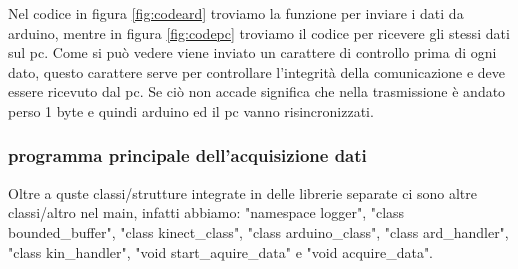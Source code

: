 \documentclass[10pt,a4paper]{article}
\begin{document}
Nel codice in figura \ref{fig:codeard} troviamo la funzione per inviare i dati da arduino, mentre in figura \ref{fig:codepc} troviamo il codice per ricevere gli stessi dati sul pc. Come si pu\`o vedere viene inviato un carattere di controllo prima di ogni dato, questo carattere serve per controllare l'integrit\`a della comunicazione e deve essere ricevuto dal pc. Se ci\`o non accade significa che nella trasmissione \`e andato perso 1 byte e quindi arduino ed il pc vanno risincronizzati. 
\clearpage
%
%
\subsubsection{programma principale dell'acquisizione dati}
Oltre a quste classi/strutture integrate in delle librerie separate ci sono altre classi/altro nel main, infatti abbiamo: "namespace logger", "class bounded\_buffer", "class kinect\_class", "class arduino\_class", "class ard\_handler", "class kin\_handler", "void start\_aquire\_data" e "void acquire\_data".
%
%
\end{document}
